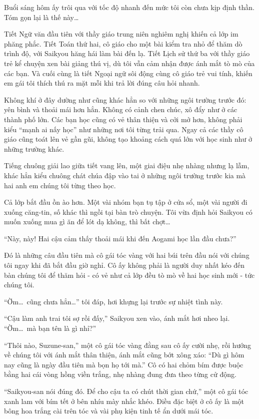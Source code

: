 \documentclass[../main.tex]{subfiles}
\begin{document}
Buổi sáng hôm ấy trôi qua với tốc độ nhanh đến mức tôi còn chưa kịp định thần. Tóm gọn lại là thế này\dots

Tiết Ngữ văn đầu tiên với thầy giáo trung niên nghiêm nghị khiến cả lớp im phăng phắc. Tiết Toán thứ hai, cô giáo cho một bài kiểm tra nhỏ để thăm dò trình độ, với Saikyou hăng hái làm bài đến lạ. Tiết Lịch sử thứ ba với thầy giáo trẻ kể chuyện xen bài giảng thú vị, dù tôi vẫn cảm nhận được ánh mắt tò mò của các bạn. Và cuối cùng là tiết Ngoại ngữ sôi động cùng cô giáo trẻ vui tính, khiến em gái tôi thích thú ra mặt mỗi khi trả lời đúng câu hỏi nhanh.

Không khí ở đây dường như cũng khác hẳn so với những ngôi trường trước đó: yên bình và thoải mái hơn hẳn. Không có cảnh chen chúc, xô đẩy như ở các thành phố lớn. Các bạn học cũng có vẻ thân thiện và cởi mở hơn, không phải kiểu ``mạnh ai nấy học'' như những nơi tôi từng trải qua. Ngay cả các thầy cô giáo cũng toát lên vẻ gần gũi, không tạo khoảng cách quá lớn với học sinh như ở những trường khác.

Tiếng chuông giải lao giữa tiết vang lên, một giai điệu nhẹ nhàng nhưng lạ lẫm, khác hẳn kiểu chuông chát chúa đập vào tai ở những ngôi trường trước kia mà hai anh em chúng tôi từng theo học.

Cả lớp bắt đầu ồn ào hơn. Một vài nhóm bạn tụ tập ở cửa sổ, một vài người đi xuống căng-tin, số khác thì ngồi tại bàn trò chuyện. Tôi vừa định hỏi Saikyou có muốn xuống mua gì ăn để lót dạ không, thì bất chợt\dots

``Này, này! Hai cậu cảm thấy thoải mái khi đến Aogami học lần đầu chưa?''

Đó là những câu đầu tiên mà cô gái tóc vàng với hai búi trên đầu nói với chúng tôi ngay khi đã bắt đầu giờ nghỉ. Cô ấy không phải là người duy nhất kéo đến bàn chúng tôi để thăm hỏi - có vẻ như cả lớp đều tò mò về hai học sinh mới - tức chúng tôi.

``Ờm\dots\ cũng chưa hẳn\dots'' tôi đáp, hơi khựng lại trước sự nhiệt tình này.

``Cậu làm anh trai tôi sợ rồi đấy,'' Saikyou xen vào, ánh mắt hơi nheo lại. ``Ờm\dots\ mà bạn tên là gì nhỉ?''

``Thôi nào, Suzune-san,'' một cô gái tóc vàng đằng sau cô ấy cười nhẹ, rồi hướng về chúng tôi với ánh mắt thân thiện, ánh mắt cũng bớt xông xáo: ``Dù gì hôm nay cũng là ngày đầu tiên mà bọn họ tới mà.'' Cô có hai chỏm bím được buộc bằng hai cái vòng hồng viền trắng, nhẹ nhàng đung đưa theo từng cử động.

``Saikyou-san nói đúng đó. Để cho cậu ta có chút thời gian chứ,'' một cô gái tóc xanh lam với bím tết ở bên nhíu mày nhắc khéo. Điều đặc biệt ở cô ấy là một bông hoa trắng cài trên tóc và vài phụ kiện tinh tế ẩn dưới mái tóc.
\end{document}
